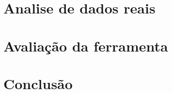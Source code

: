 \documentclass{acm_proc_article-sp}
\begin{document}
\section{Analise de dados reais}

\section{Avaliação da ferramenta}


\section{Conclusão}





\end{document}
